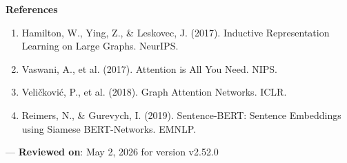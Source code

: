 \textbf{References}
\begin{enumerate}
\item Hamilton, W., Ying, Z., \& Leskovec, J. (2017). Inductive Repres\-entation Learning on Large Graphs. NeurIPS.
\item Vaswani, A., et al. (2017). Attention is All You Need. NIPS.
\item Veličković, P., et al. (2018). Graph Attention Networks. ICLR.
\item Reimers, N., \& Gurevych, I. (2019). Sentence-BERT: Sentence Embeddings using Siamese BERT-Networks. EMNLP.

\end{enumerate}
---
\textbf{Reviewed on}: May 2, 2026 for version v2.52.0

